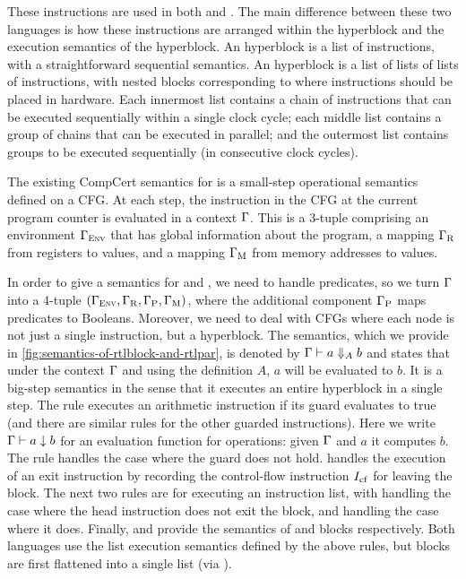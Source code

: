 These instructions are used in both \rtlblock{} and \rtlpar.  The main
difference between these two languages is how these instructions are arranged
within the hyperblock and the execution semantics of the hyperblock. An
\rtlblock{} hyperblock is a list of instructions, with a straightforward
sequential semantics. An \rtlpar{} hyperblock is a list of lists of lists of
instructions, with nested blocks corresponding to where instructions should be
placed in hardware.  Each innermost list contains a chain of instructions that
can be executed sequentially within a single clock cycle; each middle list
contains a group of chains that can be executed in parallel; and the outermost
list contains groups to be executed sequentially (in consecutive clock cycles).

The existing CompCert semantics for \rtl{} is a small-step operational semantics defined on a CFG. At each step, the
instruction in the CFG at the current program counter is
evaluated in a context $\context$. This is a 3-tuple comprising an environment
$\forestenv{\context}$ that has global information about the program, a
mapping $\forestregset{\context}$ from registers to values, and a mapping
$\forestmem{\context}$ from memory addresses to values.

In order to give a semantics for \rtlblock{} and \rtlpar{}, we need to handle predicates, so we turn $\context$ into a 4-tuple
$(\forestenv{\context}, \forestregset{\context}, \forestpredset{\context},
\forestmem{\context})$, where the additional component $\forestpredset{\context}$ maps predicates to
Booleans.
Moreover, we need to deal with CFGs where each node is not just a single instruction, but a hyperblock. The semantics, which we provide in \cref{fig:semantics-of-rtlblock-and-rtlpar}, is denoted by $\sem{A}{\context}{a}{b}$ and states that under the context $\context$ and using the definition $A$, $a$ will be evaluated to $b$. It is a big-step semantics in the sense that it executes an entire hyperblock in a single step.
The  rule executes an arithmetic instruction if its guard evaluates to true (and there are similar rules for the other guarded instructions). Here we write $\evalop{a}{b}$ for an evaluation function for operations: given $\context$ and $a$ it computes $b$. The  rule handles the case where the guard does not hold.  handles the execution of an exit instruction by recording the control-flow instruction $\cfinstr$ for leaving the block. The next two rules are for executing an instruction list, with  handling the case where the head instruction does not exit the block, and  handling the case where it does. Finally,  and  provide the semantics of \rtlblock{} and \rtlpar{} blocks respectively. Both languages use the list execution semantics defined by the above rules, but \rtlpar{} blocks are first flattened into a single list (via ).

